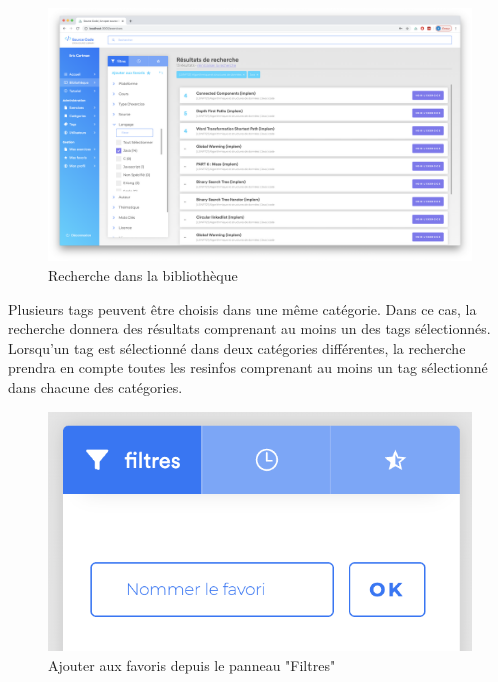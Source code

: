 \begin{figure}[H]
    \includegraphics[width=\textwidth,height=\textheight,keepaspectratio]{images/client/search-library.png}
    \centering
    \caption[SourceCode : recherche dans la bibliothèque]{Recherche dans la bibliothèque}
\end{figure}

Plusieurs \glspl{tag} peuvent être choisis dans une même catégorie. Dans ce cas, la recherche donnera des résultats comprenant au moins un des \glspl{tag} sélectionnés.\\

Lorsqu'un \gls{tag} est sélectionné dans deux catégories différentes, la recherche prendra en compte toutes les \glspl{resinfo} comprenant au moins un \gls{tag} sélectionné dans chacune des catégories.\\

\begin{figure}[H]
    \includegraphics[width=\textwidth,height=0.1\textheight,keepaspectratio]{images/client/add-favorite.png}
    \centering
    \caption[SourceCode : Ajouter aux favoris depuis le panneau "Filtres"]{Ajouter aux favoris depuis le panneau "Filtres"}
\end{figure}

